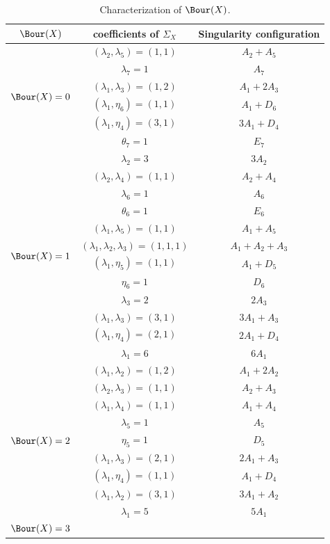 \documentclass[11pt]{amsart} %
\theoremstyle{definition}
\begin{document}
{\small 
\begin{table}[htp]
\caption{Characterization of $\Bour(X)$.}
\centering
\renewcommand{\arraystretch}{1.15}
\begin{tabular}{|c|c|c|}
\hline
$\Bour(X)$ &  coefficients  of $\Sigma_X$ & Singularity configuration \\ 
\hline
\multirow{6}{*}{$\Bour(X)=0$}
& $(\lambda_2,\lambda_5)=(1,1)$ & $A_2+A_5$ \\
& $\lambda_7=1$ & $A_7$ \\
& $(\lambda_1,\lambda_3)=(1,2)$ & $A_1+2A_3$ \\
& $(\lambda_1,\eta_6)=(1,1)$ & $A_1+D_6$ \\
& $(\lambda_1,\eta_4)=(3,1)$ & $3A_1+D_4$ \\
& $\theta_7=1$ & $E_7$ \\
\hline
\multirow{12}{*}{$\Bour(X)=1$}
& $\lambda_2=3$ & $3A_2$ \\
& $(\lambda_2,\lambda_4)=(1,1)$ & $A_2+A_4$ \\
& $\lambda_6=1$ & $A_6$ \\
& $\theta_6=1$ & $E_6$ \\
& $(\lambda_1,\lambda_5)=(1,1)$ & $A_1+A_5$ \\
& $(\lambda_1,\lambda_2,\lambda_3)=(1,1,1)$ & $A_1+A_2+A_3$ \\
& $(\lambda_1,\eta_5)=(1,1)$ & $A_1+D_5$ \\
& $\eta_6=1$ & $D_6$ \\
& $\lambda_3=2$ & $2A_3$ \\
& $(\lambda_1,\lambda_3)=(3,1)$ & $3A_1+A_3$ \\
& $(\lambda_1,\eta_4)=(2,1)$ & $2A_1+D_4$ \\
& $\lambda_1=6$ & $6A_1$ \\
\hline
\multirow{9}{*}{$\Bour(X)=2$}
& $(\lambda_1,\lambda_2)=(1,2)$ & $A_1+2A_2$ \\
& $(\lambda_2,\lambda_3)=(1,1)$ & $A_2+A_3$ \\
& $(\lambda_1,\lambda_4)=(1,1)$ & $A_1+A_4$ \\
& $\lambda_5=1$ & $A_5$ \\
& $\eta_5=1$ & $D_5$ \\
& $(\lambda_1,\lambda_3)=(2,1)$ & $2A_1+A_3$ \\
& $(\lambda_1,\eta_4)=(1,1)$ & $A_1+D_4$ \\
& $(\lambda_1,\lambda_2)=(3,1)$ & $3A_1+A_2$ \\
& $\lambda_1=5$ & $5A_1$ \\
\hline
\multirow{6}{*}{$\Bour(X)=3$}

\end{tabular}
\end{table}}
\end{document}
